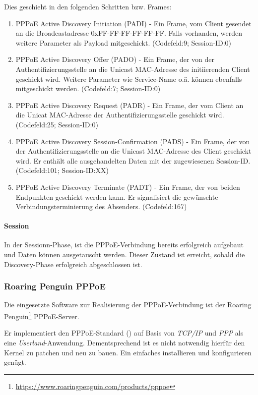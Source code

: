 Dies geschieht in den folgenden Schritten bzw. Frames:
\begin{enumerate}
\item PPPoE Active Discovery Initiation (PADI) - Ein Frame, vom Client
      gesendet an die Broadcastadresse 0xFF-FF-FF-FF-FF-FF.
      Falls vorhanden, werden weitere Parameter als Payload 
      mitgeschickt. (Codefeld:9; Session-ID:0)
\item PPPoE Active Discovery Offer (PADO) - Ein Frame, der von der
      Authentifizierungsstelle an die Unicast MAC-Adresse des
      initiierenden Client geschickt wird. Weitere Parameter wie
      Service-Name o.ä. können ebenfalls mitgeschickt
      werden. (Codefeld:7; Session-ID:0)
\item PPPoE Active Discovery Request (PADR) - Ein Frame, der vom Client
      an die Unicat MAC-Adresse der Authentifizierungsstelle geschickt
      wird. (Codefeld:25; Session-ID:0)
\item PPPoE Active Discovery Session-Confirmation (PADS) - Ein Frame,
      der von der Authentifizierungsstelle an die Unicast MAC-Adresse
      des Client geschickt wird. Er enthält alle ausgehandelten Daten
      mit der zugewiesenen Session-ID. (Codefeld:101; Session-ID:XX)
\item PPPoE Active Discovery Terminate (PADT) - Ein Frame,
      der von beiden Endpunkten geschickt werden kann. Er signalisiert
      die gewünschte Verbindungsterminierung des Absenders.
      (Codefeld:167)
\end{enumerate}

\paragraph{Session}
In der Sessionn-Phase, ist die PPPoE-Verbindung bereits erfolgreich
aufgebaut und Daten können ausgetauscht werden.
Dieser Zustand ist erreicht, sobald die Discovery-Phase
erfolgreich abgeschlossen ist.

\subsubsection{Roaring Penguin PPPoE}
Die eingesetzte Software zur Realisierung der PPPoE-Verbindung ist der
Roaring Penguin\footnote{\url{https://www.roaringpenguin.com/products/pppoe}} PPPoE-Server.

Er implementiert den PPPoE-Standard () auf Basis
von \textit{TCP/IP} und \textit{PPP} als eine \textit{Userland}-Anwendung.
Dementsprechend ist es nicht notwendig hierfür den Kernel zu patchen und neu zu bauen.
Ein einfaches installieren und konfigurieren genügt.

